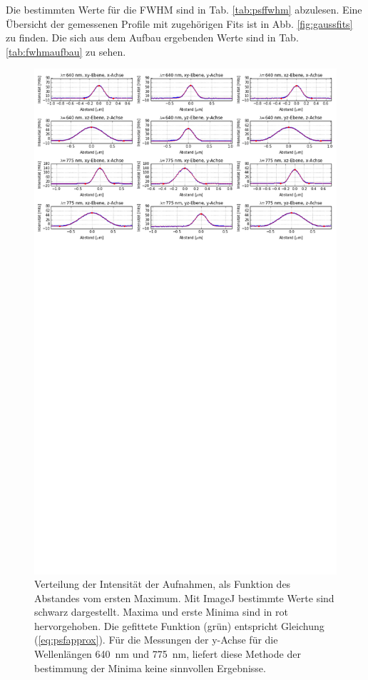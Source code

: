 Die bestimmten Werte für die FWHM sind in Tab. \ref{tab:psffwhm} abzulesen. Eine Übersicht der gemessenen Profile mit zugehörigen Fits ist in Abb. \ref{fig:gaussfits} zu finden.
Die sich aus dem Aufbau ergebenden Werte sind in Tab. \ref{tab:fwhmaufbau} zu sehen.
\begin{figure}
	\centering
	\includegraphics[trim= 0 950 0 0, width=\textwidth]{plots/goldbeads.png}
	\caption{Verteilung der Intensität der Aufnahmen, als Funktion des Abstandes vom ersten Maximum. Mit ImageJ bestimmte Werte sind schwarz dargestellt. 
		Maxima und erste Minima sind in rot hervorgehoben. 
		Die gefittete Funktion (grün) entspricht Gleichung (\ref{eq:psfapprox}). 
		Für die Messungen der y-Achse für die Wellenlängen 640~nm und 775~nm, liefert diese Methode der bestimmung der Minima keine sinnvollen Ergebnisse.
	}\label{fig:psffits}
\end{figure}
